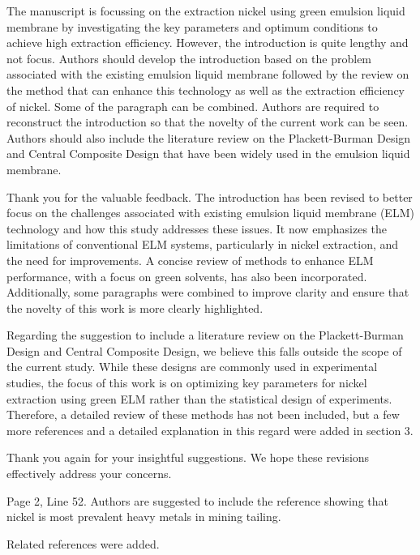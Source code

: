 \documentclass[11pt,answers]{exam}
\begin{document}
\begin{questions}
\question The manuscript is focussing on the extraction nickel using green emulsion liquid membrane by investigating the key parameters and optimum conditions to achieve high extraction efficiency. However, the introduction is quite lengthy and not focus. Authors should develop the introduction based on the problem associated with the existing emulsion liquid membrane followed by the review on the method that can enhance this technology as well as the extraction efficiency of nickel. Some of the paragraph can be combined. Authors are required to reconstruct the introduction so that the novelty of the current work can be seen. Authors should also include the literature review on the Plackett-Burman Design and Central Composite Design that have been widely used in the emulsion liquid membrane.
\begin{solutionorbox}
    Thank you for the valuable feedback. The introduction has been revised to better focus on the challenges associated with existing emulsion liquid membrane (ELM) technology and how this study addresses these issues. It now emphasizes the limitations of conventional ELM systems, particularly in nickel extraction, and the need for improvements. A concise review of methods to enhance ELM performance, with a focus on green solvents, has also been incorporated. Additionally, some paragraphs were combined to improve clarity and ensure that the novelty of this work is more clearly highlighted. 
    
    Regarding the suggestion to include a literature review on the Plackett-Burman Design and Central Composite Design, we believe this falls outside the scope of the current study. While these designs are commonly used in experimental studies, the focus of this work is on optimizing key parameters for nickel extraction using green ELM rather than the statistical design of experiments. Therefore, a detailed review of these methods has not been included, but a few more references and a detailed explanation in this regard were added in section 3.
    
    Thank you again for your insightful suggestions. We hope these revisions effectively address your concerns.


\end{solutionorbox}
\question Page 2, Line 52. Authors are suggested to include the reference showing that nickel is most prevalent heavy metals in mining tailing.
\begin{solutionorbox}
    Related references were added.
\end{solutionorbox}


\end{questions}
\end{document}
